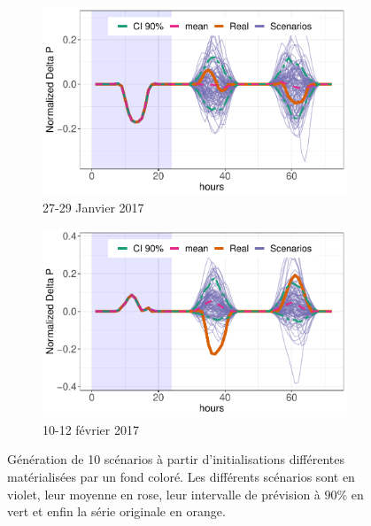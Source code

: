 \documentclass[12pt]{report}
\begin{document}
\begin{figure}[h]
\begin{center}
		\begin{subfigure}[b]{0.5\linewidth}
			\centering
			\includegraphics[width = 0.95 \linewidth]{Images/PV/HMM/id27.pdf}
			\caption{27-29 Janvier 2017}
		\end{subfigure}%
		\begin{subfigure}[b]{0.5\linewidth}
			\centering
			\includegraphics[width = 0.95 \linewidth]{Images/PV/HMM/id41.pdf}
			\caption{10-12 février 2017}
		\end{subfigure}
	\end{center}
	
	\caption{Génération de 10 scénarios à partir d'initialisations différentes matérialisées par un fond coloré. Les différents scénarios sont en violet, leur moyenne en rose, leur intervalle de prévision à $90\%$ en vert et enfin la série originale en orange.}
	\label{fig:PV_HMM_Scenarios} 
\end{figure}
\end{document}
